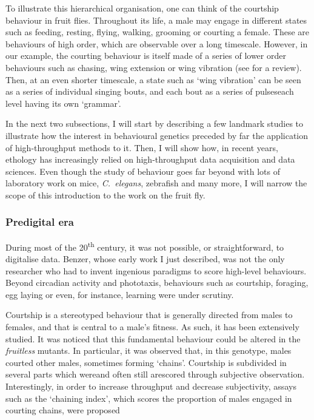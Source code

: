 To illustrate this hierarchical organisation, one can think of the courtship behaviour in fruit flies.
Throughout its life, a male may engage in different states such as feeding, resting, flying, walking, grooming or courting a female. 
These are behaviours of high order, which are observable over a long timescale.
However, in our example, the courting behaviour is itself made of a series of lower order behaviours such as chasing, wing extension or wing vibration (see \cite{lasbleiz_courtship_2006} for a review).
Then, at an even shorter timescale, a state such as `wing vibration' can be seen as a series of individual singing bouts, and each bout as a series of pulses\emd{}each level having its own `grammar'\cite{arthur_multi-channel_2013}.

In the next two subsections, I will start by describing a few landmark studies to illustrate how the interest in behavioural genetics preceded by far the application of high-throughput methods to it.
Then, I will show how, in recent years, ethology has increasingly relied on high-throughput data acquisition and data sciences.
Even though the study of behaviour goes far beyond \droso\emd{}with lots of laboratory work on mice, \emph{C.~elegans}, zebrafish and many more\emd{}, I will narrow the scope of this introduction to the work on the fruit fly.

\subsubsection{Predigital era}

During most of the 20\textsuperscript{th} century, it was not possible, or straightforward, to digitalise data.
Benzer, whose early work I just described, was not the only researcher who had to invent ingenious paradigms to score high-level behaviours. Beyond circadian activity and phototaxis, behaviours such as courtship, foraging,  egg laying or even, for instance, learning were under scrutiny.

Courtship is a stereotyped behaviour that is generally directed from males to females, and that is central to a male's fitness\cite{greenspan_courtship_2000}. As such, it has been extensively studied.
It was noticed that this fundamental behaviour could be altered in the \emph{fruitless} mutants\cite{gill_mutation_1963,hall_courtship_1978}.
In particular, it was observed that, in this genotype, males courted other males, sometimes forming `chains'.
Courtship is subdivided in several parts which were\emd{}and often still are\emd{}scored through subjective observation.
Interestingly, in order to increase throughput and decrease subjectivity, assays such as the `chaining index', which scores the proportion of males engaged in courting chains, were proposed\cite{villella_extended_1997,demir_fruitless_2005}


